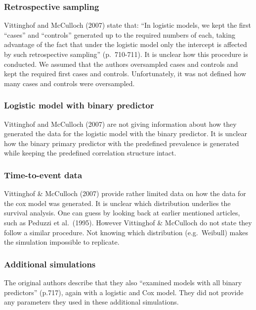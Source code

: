 \documentclass[10,a4paperpaper,]{article}
\begin{document}
\subsubsection{Retrospective sampling}

Vittinghof and McCulloch (2007) state that: ``In logistic models, we
kept the first ``cases'' and ``controls'' generated up to the required
numbers of each, taking advantage of the fact that under the logistic
model only the intercept is affected by such retrospective sampling''
(p.~710-711). It is unclear how this procedure is conducted. We assumed
that the authors oversampled cases and controls and kept the required
first cases and controls. Unfortunately, it was not defined how many
cases and controls were oversampled.

\subsubsection{Logistic model with binary predictor}

Vittinghof and McCulloch (2007) are not giving information about how
they generated the data for the logistic model with the binary
predictor. It is unclear how the binary primary predictor with the
predefined prevalence is generated while keeping the predefined
correlation structure intact.

\subsubsection{Time-to-event data}

Vittinghof \& McCulloch (2007) provide rather limited data on how the
data for the cox model was generated. It is unclear which distribution
underlies the survival analysis. One can guess by looking back at
earlier mentioned articles, such as Peduzzi et al.~(1995). However
Vittinghof \& McCulloch do not state they follow a similar procedure.
Not knowing which distribution (e.g.~Weibull) makes the simulation
impossible to replicate.

\subsubsection{Additional simulations}

The original authors describe that they also ``examined models with all
binary predictors'' (p.717), again with a logistic and Cox model. They
did not provide any parameters they used in these additional
simulations.
\end{document}
